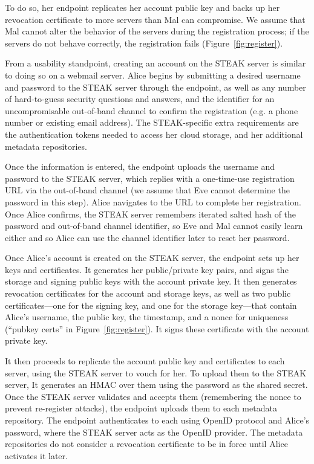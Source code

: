 To do so, her endpoint replicates her account public key and backs up her revocation certificate to more servers than Mal can compromise.  We assume that Mal cannot alter the behavior of the servers during the registration process; if the servers do not behave correctly, the registration fails (Figure~\ref{fig:register}).

From a usability standpoint, creating an account on the STEAK server is similar to doing so on a webmail server.  Alice begins by submitting a desired username and password to the STEAK server through the endpoint, as well as any number of hard-to-guess security questions and answers, and the identifier for an uncompromisable out-of-band channel to confirm the registration (e.g. a phone number or existing email address).  The STEAK-specific extra requirements are the authentication tokens needed to access her cloud storage, and her additional metadata repositories.

Once the information is entered, the endpoint uploads the username and password to the STEAK server, which replies with a one-time-use registration URL via the out-of-band channel (we assume that Eve cannot determine the password in this step).  Alice navigates to the URL to complete her registration.  Once Alice confirms, the STEAK server remembers iterated salted hash of the password and out-of-band channel identifier, so Eve and Mal cannot easily learn either and so Alice can use the channel identifier later to reset her password.

Once Alice’s account is created on the STEAK server, the endpoint sets up her keys and certificates.  It generates her public/private key pairs, and signs the storage and signing public keys with the account private key.  It then generates revocation certificates for the account and storage keys, as well as two public certificates---one for the signing key, and one for the storage key---that contain Alice’s username, the public key, the timestamp, and a nonce for uniqueness (``pubkey certs'' in Figure~\ref{fig:register}).  It signs these certificate with the account private key.

It then proceeds to replicate the account public key and certificates to each server, using the STEAK server to vouch for her.  To upload them to the STEAK server, It generates an HMAC over them using the password as the shared secret.  Once the STEAK server validates and accepts them (remembering the nonce to prevent re-register attacks), the endpoint uploads them to each metadata repository.  The endpoint authenticates to each using OpenID protocol and Alice’s password, where the STEAK server acts as the OpenID provider.  The metadata repositories do not consider a revocation certificate to be in force until Alice activates it later.

